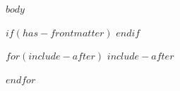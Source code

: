 \documentclass[english,12pt,svgnames]{article}
\begin{document}
\date{}
\author{} %

\maketitle
\thispagestyle{empty}
\hypersetup{pageanchor=true} %


\newpage
{
    \hypersetup{linkcolor=black}
    \tableofcontents

}
\newpage

$body$
\newpage

$if(has-frontmatter)$
\backmatter
$endif$



$for(include-after)$
$include-after$

$endfor$
\end{document}
